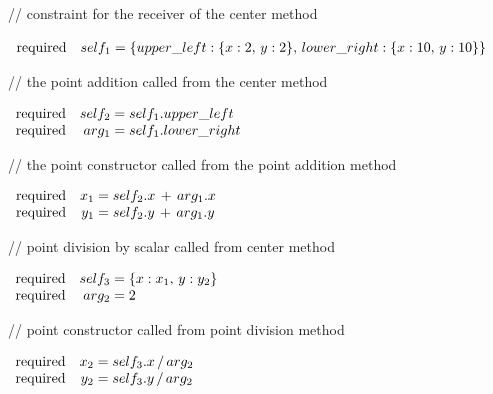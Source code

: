 \begin{flushright}
// constraint for the receiver of the center method
\end{flushright}\vspace{-0.5\baselineskip}
$\begin{array}{rr@{\;=\;}l}
\mathrm{required} & self_1 & \{upper\_left: \{x:2,\,y:2\},\,lower\_right: \{x:10,\,y:10\}\}
\end{array}$\vspace{-0.5\baselineskip}
\begin{flushright}
// the point addition called from the center method
\end{flushright}\vspace{-0.5\baselineskip}
$\begin{array}{rr@{\;=\;}l}
\mathrm{required} & self_2 & self_1.upper\_left\\
\mathrm{required} & arg_1 & self_1.lower\_right
\end{array}$\vspace{-0.5\baselineskip}
\begin{flushright}
// the point constructor called from the point addition method
\end{flushright}\vspace{-0.5\baselineskip}
$\begin{array}{rr@{\;=\;}l}
\mathrm{required} & x_1 & self_2.x\,+\,arg_1.x\\
\mathrm{required} & y_1 & self_2.y\,+\,arg_1.y
\end{array}$\vspace{-0.5\baselineskip}
\begin{flushright}
// point division by scalar called from center method
\end{flushright}\vspace{-0.5\baselineskip}
$\begin{array}{rr@{\;=\;}l}
\mathrm{required} & self_3 & \{x: x_1,\,y: y_2\}\\
\mathrm{required} & arg_2 & 2
\end{array}$\vspace{-0.5\baselineskip}
\begin{flushright}
// point constructor called from point division method
\end{flushright}\vspace{-0.5\baselineskip}
$\begin{array}{rr@{\;=\;}l}
\mathrm{required} & x_2 & self_3.x\,/\,arg_2\\
\mathrm{required} & y_2 & self_3.y\,/\,arg_2
\end{array}$\vspace{-0.5\baselineskip}
